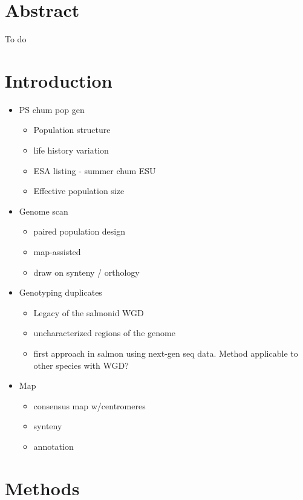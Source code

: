 \documentclass[12pt,  one column]{article}
\begin{document}
\section*{Abstract}
To do

\section*{Introduction}

\begin{itemize}

\item PS chum pop gen
\begin{itemize}
\item Population structure
\item life history variation
\item ESA listing - summer chum ESU
\item Effective population size
\end{itemize}

\item Genome scan
\begin{itemize}
\item paired population design
\item map-assisted
\item draw on synteny / orthology
\end{itemize}

\item Genotyping duplicates
\begin{itemize}
\item Legacy of the salmonid WGD
\item uncharacterized regions of the genome
\item first approach in salmon using next-gen seq data.  Method applicable to other species with WGD? 

\end{itemize}

\item Map
\begin{itemize}
\item consensus map w/centromeres
\item synteny
\item annotation
\end{itemize}

\end{itemize}


\section*{Methods}
\end{document}
